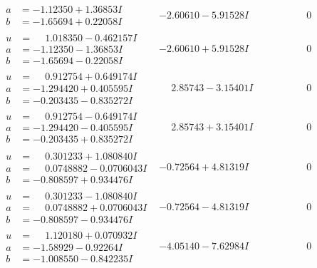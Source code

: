 \documentclass[1p]{elsarticle_modified}
\theoremstyle{definition}
\begin{document}
$$\begin{array}{c|c|c}
\begin{aligned}
a &= -1.12350 + 1.36853 I \\
b &= -1.65694 + 0.22058 I\end{aligned}
 & -2.60610 - 5.91528 I & \phantom{-0.000000 } 0 \\ \hline\begin{aligned}
u &= \phantom{-}1.018350 - 0.462157 I \\
a &= -1.12350 - 1.36853 I \\
b &= -1.65694 - 0.22058 I\end{aligned}
 & -2.60610 + 5.91528 I & \phantom{-0.000000 } 0 \\ \hline\begin{aligned}
u &= \phantom{-}0.912754 + 0.649174 I \\
a &= -1.294420 + 0.405595 I \\
b &= -0.203435 - 0.835272 I\end{aligned}
 & \phantom{-}2.85743 - 3.15401 I & \phantom{-0.000000 } 0 \\ \hline\begin{aligned}
u &= \phantom{-}0.912754 - 0.649174 I \\
a &= -1.294420 - 0.405595 I \\
b &= -0.203435 + 0.835272 I\end{aligned}
 & \phantom{-}2.85743 + 3.15401 I & \phantom{-0.000000 } 0 \\ \hline\begin{aligned}
u &= \phantom{-}0.301233 + 1.080840 I \\
a &= \phantom{-}0.0748882 - 0.0706043 I \\
b &= -0.808597 + 0.934476 I\end{aligned}
 & -0.72564 + 4.81319 I & \phantom{-0.000000 } 0 \\ \hline\begin{aligned}
u &= \phantom{-}0.301233 - 1.080840 I \\
a &= \phantom{-}0.0748882 + 0.0706043 I \\
b &= -0.808597 - 0.934476 I\end{aligned}
 & -0.72564 - 4.81319 I & \phantom{-0.000000 } 0 \\ \hline\begin{aligned}
u &= \phantom{-}1.120180 + 0.070932 I \\
a &= -1.58929 - 0.92264 I \\
b &= -1.008550 - 0.842235 I\end{aligned}
 & -4.05140 - 7.62984 I & \phantom{-0.000000 } 0 \\ \hline\begin{aligned}

\end{aligned}
\end{array}$$
\end{document}
